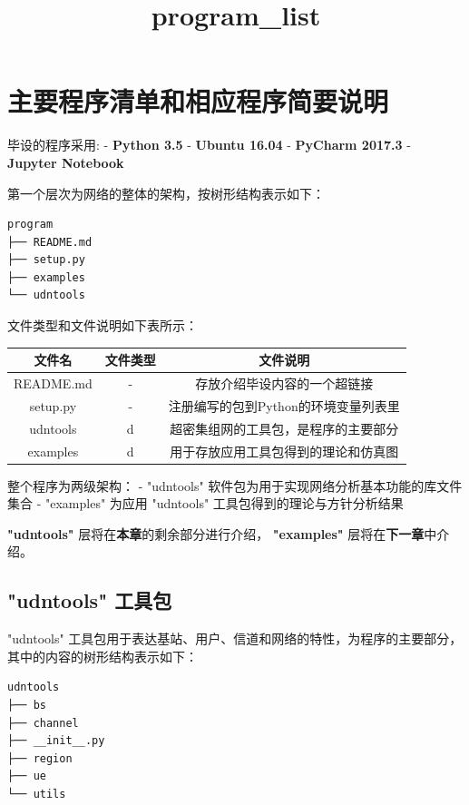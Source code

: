 \documentclass[11pt]{article}
\title{program\_list}
\begin{document}
    
    
    \maketitle
    
    

    
    \section{主要程序清单和相应程序简要说明}\label{ux4e3bux8981ux7a0bux5e8fux6e05ux5355ux548cux76f8ux5e94ux7a0bux5e8fux7b80ux8981ux8bf4ux660e}

毕设的程序采用: - \textbf{Python 3.5} - \textbf{Ubuntu 16.04} -
\textbf{PyCharm 2017.3} - \textbf{Jupyter Notebook}

第一个层次为网络的整体的架构，按树形结构表示如下：

\begin{verbatim}
program
├── README.md
├── setup.py
├── examples
└── udntools
\end{verbatim}

文件类型和文件说明如下表所示：

\begin{longtable}[c]{@{}ccc@{}}
\toprule
文件名 & 文件类型 & 文件说明\tabularnewline
\midrule
\endhead
README.md & - & 存放介绍毕设内容的一个超链接\tabularnewline
setup.py & - & 注册编写的包到Python的环境变量列表里\tabularnewline
udntools & d & 超密集组网的工具包，是程序的主要部分\tabularnewline
examples & d & 用于存放应用工具包得到的理论和仿真图\tabularnewline
\bottomrule
\end{longtable}

整个程序为两级架构： - "udntools"
软件包为用于实现网络分析基本功能的库文件集合 - "examples" 为应用
"udntools" 工具包得到的理论与方针分析结果

\textbf{"udntools"} 层将在\textbf{本章}的剩余部分进行介绍，
\textbf{"examples"} 层将在\textbf{下一章}中介绍。

\subsection{"udntools" 工具包}\label{udntools-ux5de5ux5177ux5305}

"udntools"
工具包用于表达基站、用户、信道和网络的特性，为程序的主要部分，其中的内容的树形结构表示如下：

\begin{verbatim}
udntools
├── bs
├── channel
├── __init__.py
├── region
├── ue
└── utils
\end{verbatim}
\end{document}

